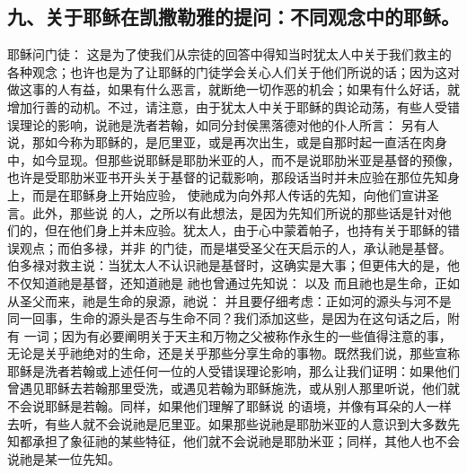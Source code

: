 \subsection{九、关于耶稣在凯撒勒雅的提问：不同观念中的耶稣。}

 耶稣问门徒： 这是为了使我们从宗徒的回答中得知当时犹太人中关于我们救主的各种观念；也许也是为了让耶稣的门徒学会关心人们关于他们所说的话；因为这对做这事的人有益，如果有什么恶言，就断绝一切作恶的机会；如果有什么好话，就增加行善的动机。不过，请注意，由于犹太人中关于耶稣的舆论动荡，有些人受错误理论的影响，说祂是洗者若翰，如同分封侯黑落德对他的仆人所言： 另有人说，那如今称为耶稣的，是厄里亚，或是再次出生，或是自那时起一直活在肉身中，如今显现。但那些说耶稣是耶肋米亚的人，而不是说耶肋米亚是基督的预像，也许是受耶肋米亚书开头关于基督的记载影响，那段话当时并未应验在那位先知身上，而是在耶稣身上开始应验， 使祂成为向外邦人传话的先知，向他们宣讲圣言。此外，那些说 的人，之所以有此想法，是因为先知们所说的那些话是针对他们的，但在他们身上并未应验。犹太人，由于心中蒙着帕子，也持有关于耶稣的错误观点；而伯多禄，并非 的门徒，而是堪受圣父在天启示的人，承认祂是基督。伯多禄对救主说：当犹太人不认识祂是基督时，这确实是大事；但更伟大的是，他不仅知道祂是基督，还知道祂是 祂也曾通过先知说： 以及 而且祂也是生命，正如从圣父而来，祂是生命的泉源，祂说： 并且要仔细考虑：正如河的源头与河不是同一回事，生命的源头是否与生命不同？我们添加这些，是因为在这句话之后，附有 一词；因为有必要阐明关于天主和万物之父被称作永生的一些值得注意的事，无论是关乎祂绝对的生命，还是关乎那些分享生命的事物。既然我们说，那些宣称耶稣是洗者若翰或上述任何一位的人受错误理论影响，那么让我们证明：如果他们曾遇见耶稣去若翰那里受洗，或遇见若翰为耶稣施洗，或从别人那里听说，他们就不会说耶稣是若翰。同样，如果他们理解了耶稣说 的语境，并像有耳朵的人一样去听，有些人就不会说祂是厄里亚。如果那些说祂是耶肋米亚的人意识到大多数先知都承担了象征祂的某些特征，他们就不会说祂是耶肋米亚；同样，其他人也不会说祂是某一位先知。\par

